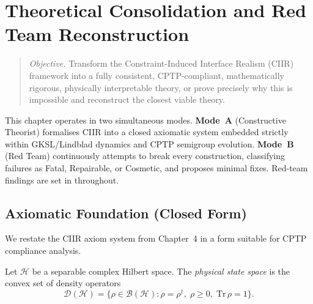 %
%

\chapter{Theoretical Consolidation and Red Team Reconstruction}
\label{ch:consolidation}

\begin{quote}
\textit{Objective.}  Transform the Constraint-Induced Interface Realism
(CIIR) framework into a fully consistent, CPTP-compliant, mathematically
rigorous, physically interpretable theory, or prove precisely why this is
impossible and reconstruct the closest viable theory.
\end{quote}

This chapter operates in two simultaneous modes.  \textbf{Mode~A}
(Constructive Theorist) formalises CIIR into a closed axiomatic system
embedded strictly within GKSL/Lindblad dynamics and CPTP semigroup
evolution.  \textbf{Mode~B} (Red Team) continuously attempts to break
every construction, classifying failures as Fatal, Repairable, or
Cosmetic, and proposes minimal fixes.  Red-team findings are set in
 throughout.

\section{Axiomatic Foundation (Closed Form)}
\label{sec:c9:axioms}

We restate the CIIR axiom system from Chapter~4 in a form suitable for
CPTP compliance analysis.

\begin{definition}
\label{def:c9:statespace}
Let $\mathcal{H}$ be a separable complex Hilbert space.  The
\emph{physical state space} is the convex set of density operators
\begin{equation}
  \mathcal{D}(\mathcal{H}) = \bigl\{
    \rho \in \mathcal{B}(\mathcal{H}) :
    \rho = \rho^\dagger,\;
    \rho \geq 0,\;
    \mathrm{Tr}\,\rho = 1
  \bigr\}.
  \label{eq:c9:dh}
\end{equation}
\end{definition}

